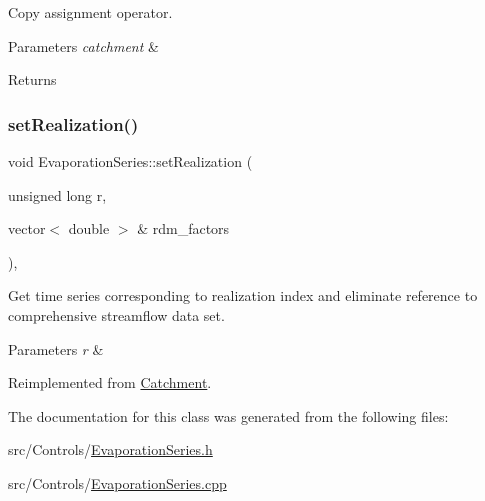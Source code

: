 Copy assignment operator. 
\begin{DoxyParams}{Parameters}
{\em catchment} & \\
\hline
\end{DoxyParams}
\begin{DoxyReturn}{Returns}

\end{DoxyReturn}
\mbox{\label{classEvaporationSeries_a4985ac4c81ec111657861e5750b24c0e}} 
\subsubsection{\texorpdfstring{set\+Realization()}{setRealization()}}
{\footnotesize\ttfamily void Evaporation\+Series\+::set\+Realization (\begin{DoxyParamCaption}\item[{unsigned long}]{r,  }\item[{vector$<$ double $>$ \&}]{rdm\+\_\+factors }\end{DoxyParamCaption})\hspace{0.3cm}{\ttfamily [override]}, {\ttfamily [virtual]}}

Get time series corresponding to realization index and eliminate reference to comprehensive streamflow data set. 
\begin{DoxyParams}{Parameters}
{\em r} & \\
\hline
\end{DoxyParams}


Reimplemented from \mbox{\hyperlink{classCatchment_affb9042c5854a76efd864ce87d7d1877}{Catchment}}.



The documentation for this class was generated from the following files\+:\begin{DoxyCompactItemize}
\item 
src/\+Controls/\mbox{\hyperlink{EvaporationSeries_8h}{Evaporation\+Series.\+h}}\item 
src/\+Controls/\mbox{\hyperlink{EvaporationSeries_8cpp}{Evaporation\+Series.\+cpp}}\end{DoxyCompactItemize}
